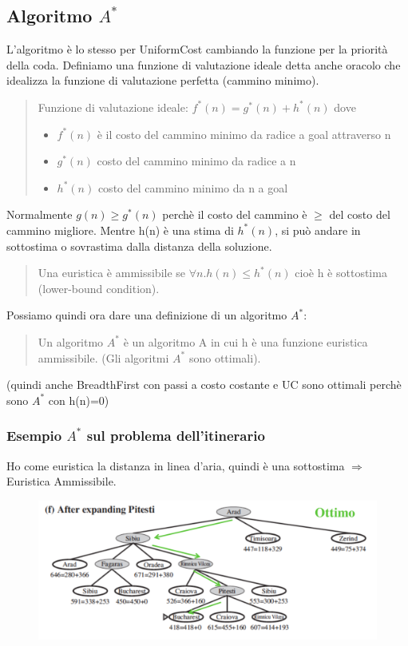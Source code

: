 \documentclass{article}
\begin{document}
\subsection{Algoritmo $A^*$}
L'algoritmo è lo stesso per UniformCost cambiando la funzione per la priorità della coda. Definiamo una funzione di valutazione ideale detta anche oracolo che idealizza la funzione di valutazione perfetta (cammino minimo).
\begin{quote}
    Funzione di valutazione ideale: $f^*(n) = g^*(n)+h^*(n)$ dove
    \begin{itemize}
        \item $f^*(n)$ è il costo del cammino minimo da radice a goal attraverso n
        \item $g^*(n)$ costo del cammino minimo da radice a n
        \item $h^*(n)$ costo del cammino minimo da n a goal
    \end{itemize}
\end{quote}
Normalmente $g(n) \geq g^*(n)$ perchè il costo del cammino è $\geq$ del costo del cammino migliore. Mentre h(n) è una stima di $h^*(n)$, si può andare in sottostima o sovrastima dalla distanza della soluzione.
\begin{quote}
    Una euristica è ammissibile se $\forall n . h(n) \leq h^*(n)$ cioè h è sottostima (lower-bound condition).
\end{quote}
Possiamo quindi ora dare una definizione di un algoritmo $A^*$:
\begin{quote}
    Un algoritmo $A^*$ è un algoritmo A in cui h è una funzione euristica ammissibile. (Gli algoritmi $A^*$ sono ottimali).
\end{quote}
(quindi anche BreadthFirst con passi a costo costante e UC sono ottimali perchè sono $A^*$ con h(n)=0)

\subsubsection{Esempio $A^*$ sul problema dell'itinerario}
Ho come euristica la distanza in linea d'aria, quindi è una sottostima $\Rightarrow$ Euristica Ammissibile.
\begin{figure}[H]
    \centering
    \includegraphics[scale=0.6]{Images/itinerarioAstar.png}
\end{figure}
\end{document}
